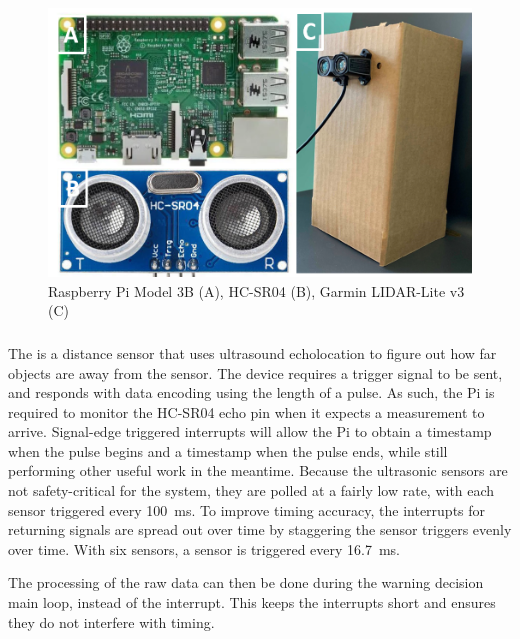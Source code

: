 \documentclass[journal]{IEEEtran}
\begin{document}
\begin{figure}
    \centering
    \includegraphics[width=\columnwidth]{images/rpi_range.png}
    \caption{Raspberry Pi Model 3B (A), HC-SR04 (B), Garmin LIDAR-Lite v3 (C)}
    \label{fig:rpi_range}
\end{figure}

\subsubsection{\sonar{}}

The \sonar{} is a distance sensor that uses ultrasound echolocation to figure out how far objects are away from the sensor. The device requires a trigger signal to be sent, and responds with data encoding using the length of a pulse. As such, the Pi is required to monitor the HC-SR04 echo pin when it expects a measurement to arrive. Signal-edge triggered interrupts will allow the Pi to obtain a timestamp when the pulse begins and a timestamp when the pulse ends, while still performing other useful work in the meantime. Because the ultrasonic sensors are not safety-critical for the system, they are polled at a fairly low rate, with each sensor triggered every \SI{100}{\milli\s}. To improve timing accuracy, the interrupts for returning signals are spread out over time by staggering the sensor triggers evenly over time. With six sensors, a sensor is triggered every \SI{16.7}{\milli\s}.

The processing of the raw data can then be done during the warning decision main loop, instead of the interrupt. This keeps the interrupts short and ensures they do not interfere with timing.

\subsubsection{\lidar{}}
\end{document}
